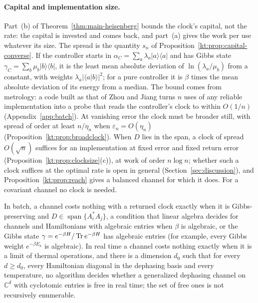 \paragraph{Capital and implementation size.} Part~(b) of Theorem~\ref{thm:main-heisenberg} bounds the clock's capital, not the rate: the capital is invested and comes back, and part~(a) gives the work per use whatever its size. The spread is the quantity $s_n$ of Proposition~\ref{kt:prop:capital-converse}. If the controller starts in $\alpha_C=\sum_a\lambda_a|a\rangle\langle a|$ and has Gibbs state $\gamma_C=\sum_b\mu_b|b\rangle\langle b|$, it is the least mean absolute deviation of $\ln(\lambda_a/\mu_b)$ from a constant, with weights $\lambda_a|\langle a|b\rangle|^2$; for a pure controller it is $\beta$ times the mean absolute deviation of its energy from a median. The bound comes from metrology: a code built as that of Zhou and Jiang turns $n$ uses of any reliable implementation into a probe that reads the controller's clock to within $O(1/n)$ (Appendix~\ref{app:batch}). At vanishing error the clock must be broader still, with spread of order at least $n/\eta_n$ when $\varepsilon_n=O(\eta_n)$ (Proposition~\ref{kt:prop:broadclock}). When $D$ lies in the span, a clock of spread $O(\sqrt n)$ suffices for an implementation at fixed error and fixed return error (Proposition~\ref{kt:prop:clocksize}(c)), at work of order $n\log n$; whether such a clock suffices at the optimal rate is open in general (Section~\ref{sec:discussion}), and Proposition~\ref{kt:prop:reach} gives a balanced channel for which it does. For a covariant channel no clock is needed.

\begin{theorem}\label{thm:main-undecidable}
In batch, a channel costs nothing with a returned clock exactly when it is Gibbs-preserving and $D\in\operatorname{span}\{A_i^*A_j\}$, a condition that linear algebra decides for channels and Hamiltonians with algebraic entries when $\beta$ is algebraic, or the Gibbs state $\gamma=e^{-\beta H}/\operatorname{Tr} e^{-\beta H}$ has algebraic entries (for example, every Gibbs weight $e^{-\beta E_k}$ is algebraic). In real time a channel costs nothing exactly when it is a limit of thermal operations, and there is a dimension $d_0$ such that for every $d\ge d_0$, every Hamiltonian diagonal in the dephasing basis and every temperature, no algorithm decides whether a generalized dephasing channel on $\mathbb C^d$ with cyclotomic entries is free in real time; the set of free ones is not recursively enumerable.
\end{theorem}

